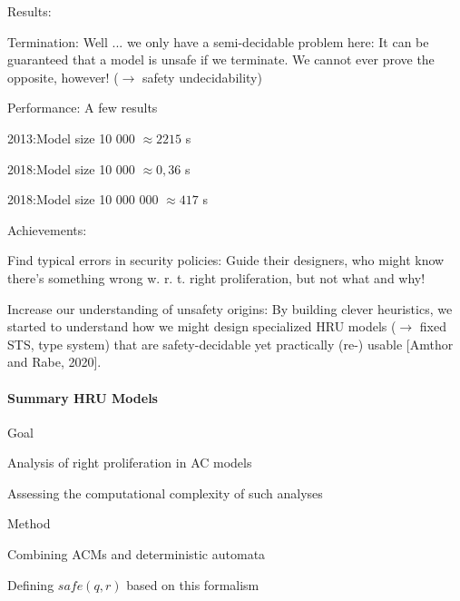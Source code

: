 \documentclass[a4paper]{article}
\begin{document}
\begin{multicols}{3}
    Results:
    \begin{itemize*}
        \item Termination: Well ... we only have a semi-decidable problem here: It can be guaranteed that a model is unsafe if we terminate. We cannot ever prove the opposite, however! ($\rightarrow$ safety undecidability)
        \item Performance: A few results
              \begin{itemize*}
                  \item 2013:Model size 10 000 $\approx 2215$ s
                  \item 2018:Model size 10 000 $\approx 0,36$ s
                  \item 2018:Model size 10 000 000 $\approx 417$ s
              \end{itemize*}
    \end{itemize*}

    Achievements:
    \begin{itemize*}
        \item Find typical errors in security policies: Guide their designers, who might know there’s something wrong w. r. t. right proliferation, but not what and why!
        \item Increase our understanding of unsafety origins: By building clever heuristics, we started to understand how we might design specialized HRU models ($\rightarrow$ fixed STS, type system) that are safety-decidable yet practically (re-) usable [Amthor and Rabe, 2020].
    \end{itemize*}

    \paragraph{Summary HRU Models}
    Goal
    \begin{itemize*}
        \item Analysis of right proliferation in AC models
        \item Assessing the computational complexity of such analyses
    \end{itemize*}

    Method
    \begin{itemize*}
        \item Combining ACMs and deterministic automata
        \item Defining $safe(q,r)$ based on this formalism
    \end{itemize*}


\end{multicols}
\end{document}
